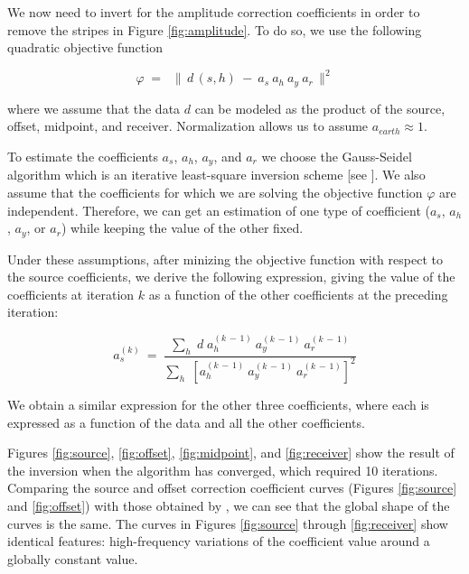 \par
We now need to invert for the amplitude correction coefficients in order to 
remove the stripes in Figure \ref{fig:amplitude}. To do so, we use the following 
quadratic objective function

\begin{equation}
	\varphi \; = \; \; \parallel \, d \, \left( s, h \right) \: - \:
		a_{s} \: a_{h} \: a_{y} \: a_{r} \, \parallel^{2}
\end{equation}

\noindent
where we assume that the data $d$ can be modeled as the product of the source, 
offset, midpoint, and receiver. Normalization allows us to assume 
$a_{earth} \approx 1$.

\par
To estimate the coefficients $a_{s}$, $a_{h}$, $a_{y}$, and $a_{r}$ we choose 
the Gauss-Seidel algorithm which is an iterative least-square inversion 
scheme [see \cite{Stark.1970}]. We also assume that the coefficients
for which we are solving the objective function $\varphi$ are independent. 
Therefore, we can get an estimation of one type of coefficient ($a_{s}$, 
$a_{h}$, $a_{y}$, or $a_{r}$) while keeping the value of the other fixed.

\par
Under these assumptions, after minizing the objective function with respect 
to the source coefficients, we derive the following expression, giving the 
value of the coefficients at iteration $k$ as a function of the other 
coefficients at the preceding iteration:

\begin{equation}
	a_{s}^{(k)} \: = \: \frac{\sum_{h} \; d \; a_{h}^{(k \, - \, 1)} \:
		a_{y}^{(k \, - \, 1)} \: a_{r}^{(k \, - \, 1)}}
		{\sum_{h} \; \left[ a_{h}^{(k \, - \, 1)} \: 
		a_{y}^{(k \, - \, 1)} \: a_{r}^{(k \, - \, 1)} \right]^2}
\end{equation}

\noindent
We obtain a similar expression for the other three coefficients, where each
is expressed as a function of the data and all the other coefficients.

\par
Figures \ref{fig:source}, \ref{fig:offset}, \ref{fig:midpoint},
and \ref{fig:receiver} show the result of the inversion when the
algorithm has converged, which required 10 iterations. Comparing the
source and offset correction coefficient curves
(Figures \ref{fig:source} and \ref{fig:offset}) with those obtained
by \cite{Berlioux.sep.80.349}, we can see that the global shape of the
curves is the same. The curves in Figures \ref{fig:source} through
\ref{fig:receiver} show identical features: high-frequency variations of the 
coefficient value around a globally constant value.

